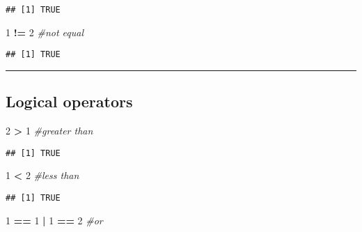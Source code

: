 \documentclass[]{article}
\newenvironment{Shaded}{\begin{snugshade}}{\end{snugshade}}
\newcommand{\CommentTok}[1]{\textcolor[rgb]{0.56,0.35,0.01}{\textit{#1}}}
\newcommand{\DecValTok}[1]{\textcolor[rgb]{0.00,0.00,0.81}{#1}}
\newcommand{\OperatorTok}[1]{\textcolor[rgb]{0.81,0.36,0.00}{\textbf{#1}}}
\newcommand{\StringTok}[1]{\textcolor[rgb]{0.31,0.60,0.02}{#1}}
\begin{document}
\begin{verbatim}
## [1] TRUE
\end{verbatim}

\begin{Shaded}
\begin{Highlighting}[]
\DecValTok{1} \OperatorTok{!=}\StringTok{ }\DecValTok{2} \CommentTok{#not equal}
\end{Highlighting}
\end{Shaded}

\begin{verbatim}
## [1] TRUE
\end{verbatim}

\begin{center}\rule{0.5\linewidth}{\linethickness}\end{center}

\hypertarget{logical-operators-1}{%
\subsection{Logical operators}\label{logical-operators-1}}

\begin{Shaded}
\begin{Highlighting}[]
\DecValTok{2} \OperatorTok{>}\StringTok{ }\DecValTok{1} \CommentTok{#greater than}
\end{Highlighting}
\end{Shaded}

\begin{verbatim}
## [1] TRUE
\end{verbatim}

\begin{Shaded}
\begin{Highlighting}[]
\DecValTok{1} \OperatorTok{<}\StringTok{ }\DecValTok{2} \CommentTok{#less than}
\end{Highlighting}
\end{Shaded}

\begin{verbatim}
## [1] TRUE
\end{verbatim}

\begin{Shaded}
\begin{Highlighting}[]
\DecValTok{1} \OperatorTok{==}\StringTok{ }\DecValTok{1} \OperatorTok{|}\StringTok{ }\DecValTok{1} \OperatorTok{==}\StringTok{ }\DecValTok{2} \CommentTok{#or}
\end{Highlighting}
\end{Shaded}
\end{document}
